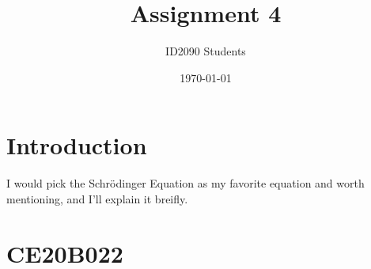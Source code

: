 \documentclass[a4paper, 12pt]{article}
\begin{document}
\title{Assignment 4}
\author{ID2090 Students}
\date{\today}
\maketitle

\tableofcontents

\section{Introduction}
I would pick the Schrödinger Equation as my favorite equation and worth mentioning, and I'll explain it breifly.

\section{CE20B022}

\end{document}
